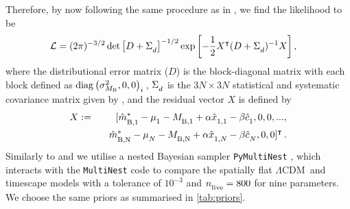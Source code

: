 \documentclass[fleqn,usenatbib]{mnras}
\newcommand{\LA}{\Lambda}
\newcommand{\lcdm}{spatially flat $\LA$CDM}
\newcommand{\Z}[1]{_{\lower2pt\hbox{$\scriptstyle#1$}}}
\newcommand{\Ns}[1]{_{\lower2pt\hbox{$\scriptstyle\rm#1$}}}
\newcommand{\hblank}[1]{\hbox to#1 mm{\hfil}}
\begin{document}
Therefore, by now following the same procedure as in \citet{Lane_2023}, we find the likelihood to be
\begin{align}
    \mathcal{L} &= (2 \pi)^{-3/2} \det\left[ D + \Sigma \Z d \right]^{-1/2} \exp\left[-\frac{1}{2}X^\intercal( D + \Sigma \Z {d})^{-1} X\right]\label{eq:likelihoodFull},
\end{align}
where the distributional error matrix ($D$) is the block-diagonal matrix with each block defined as ${\rm diag}\left( \sigma^2_{M_{\rm B}}, 0, 0\right)_i\,$, $\Sigma \Z d$ is the $3N \times 3N$ statistical and systematic covariance matrix given by \citet[Sec.~2]{Lane_2023}, and the residual vector $X$ is defined by 
\begin{eqnarray*}
X &:=& [\hat{m}_{\lower2pt\hbox{$\scriptstyle \rm B,1$}}^{*}-\mu _{\lower2pt\hbox{$\scriptstyle 1$}}-M_{\lower2pt\hbox{$\scriptstyle \rm B,1$}} + \alpha \hat{x}_{\lower2pt\hbox{$\scriptstyle 1,1$}}-\beta \hat{c}_{\lower2pt\hbox{$\scriptstyle 1$}}, 0, 0, ..., \nonumber \\
&&\hbox to3mm{\hfil } \hat{m}_{\lower2pt\hbox{$\scriptstyle \rm B, N$}}^{*}-\mu _{\lower2pt\hbox{$\scriptstyle N$}}-M_{\lower2pt\hbox{$\scriptstyle \rm B, N$}} + \alpha \hat{x}_{\lower2pt\hbox{$\scriptstyle 1, N$}}-\beta \hat{c}_{\lower2pt\hbox{$\scriptstyle N$}}, 0, 0]^\intercal \, . 
\end{eqnarray*}
Similarly to \citet{Dam_2017} and \citet{Lane_2023} we utilise a nested Bayesian sampler \texttt{PyMultiNest} \citep{Buchner_2014}, which interacts with the \texttt{MultiNest} \citep{Feroz_2008, Feroz_2009, Feroz_2019} code to compare the \lcdm\ and timescape models with a tolerance of $10^{-3}$ and $n\Ns{live} = 800$ for nine parameters. We choose the same priors as \citet[Table~B2 \& Sec.~3]{Lane_2023} summarised in \cref{tab:priors}. 
\end{document}
